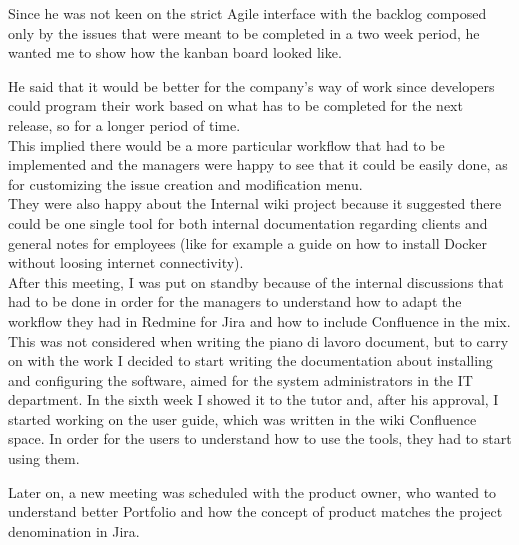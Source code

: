 	
	Since he was not keen on the strict Agile interface with the backlog composed only by the issues that were meant to be completed in a two week period, he wanted me to show how the kanban board looked like.
	
	
	He said that it would be better for the company's way of work since developers could program their work based on what has to be completed for the next release, so for a longer period of time.\\	
	This implied there would be a more particular workflow that had to be implemented and the managers were happy to see that it could be easily done, as for customizing the issue creation and modification menu.\\
	They were also happy about the Internal wiki project because it suggested there could be one single tool for both internal documentation regarding clients and general notes for employees (like for example a guide on how to install Docker without loosing internet connectivity).\\	
	After this meeting, I was put on standby because of the internal discussions that had to be done in order for the managers to understand how to adapt the workflow they had in Redmine for Jira and how to include Confluence in the mix.
	This was not considered when writing the piano di lavoro document, but to carry on with the work I decided to start writing the documentation about installing and configuring the software, aimed for the system administrators in the IT department.
	In the sixth week I showed it to the tutor and, after his approval, I started working on the user guide, which was written in the wiki Confluence space.
	In order for the users to understand how to use the tools, they had to start using them.
	
	
	Later on, a new meeting was scheduled with the product owner, who wanted to understand better Portfolio and how the concept of product matches the project denomination in Jira.
	
